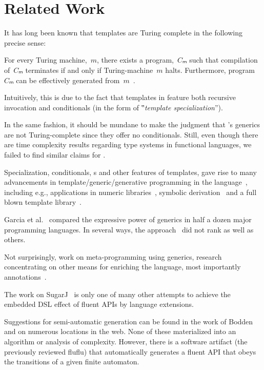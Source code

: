 \section{Related Work}

It has long been known
  that \CC templates are Turing complete in the following precise sense:

\begin{Proposition}
  \label{Theorem:Gutterman}
  For every Turing machine,~$m$, there exists a \CC program,~$Cₘ$ such that
    compilation of~$Cₘ$ terminates if and only if
      Turing-machine~$m$ halts.
      Furthermore, program~$Cₘ$ can be effectively generated from~$m$~\cite{Gutterman:2003}.
\end{Proposition}

Intuitively, this is due to the fact that templates in \CC
  feature both recursive invocation and conditionals (in the form of
  ‟\emph{template specialization}”).

In the same fashion, it should be mundane to make the judgment that
  \Java's generics are not Turing-complete since they offer no conditionals.
Still, even though there are time complexity results regarding type systems in functional
  languages, we failed to find similar claims for \Java.

Specialization, conditionals, s and other features of \CC templates,
  gave rise to many advancements in template/generic/generative programming
  in the language~\cite{Austern:98,Musser:Stepanov:1989,Backhouse:Jansson:1999,Dehnert:Stepanov:2000},
  including e.g., applications in numeric libraries~\cite{Veldhuizen:95,Vandevoorde:Josuttis:02},
  symbolic derivation~\cite{Gil:Gutterman:98}
  and a full blown template library~\cite{Abrahams:Gurtovoy:04}.

Garcia et al.~\cite{Garcia:Jarvi:Lumsdaine:Siek:Willcock:03} compared
  the expressive power of generics in half a dozen major programming languages.
  In several ways, the \Java approach~\cite{Bracha:Odersky:Stoutamire:Wadler:98}
  did not rank as well as others.

Not surprisingly, work on meta-programming using \Java generics,
  research concentrating on other means for enriching the language,
  most importantly annotations~\cite{Papi:08}.

The work on SugarJ~\cite{Erdweg:2011} is only one of many other attempts
  to achieve the embedded DSL effect of fluent APIs by language extensions.

Suggestions for semi-automatic generation can be found in the work of
Bodden~\cite{Bodden:14} and on numerous locations in the web.  None of these
materialized into an algorithm or analysis of complexity.  However, there is a
software artifact (the previously reviewed
fluflu) that automatically generates a
fluent API that obeys the transitions of a given finite automaton.

